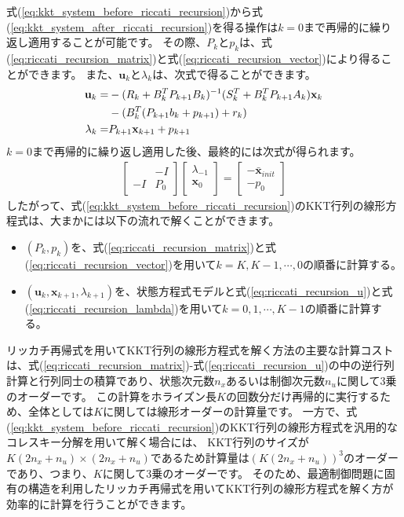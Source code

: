 \documentclass[a4paper]{jarticle}
\begin{document}
式(\ref{eq:kkt_system_before_riccati_recursion})から式(\ref{eq:kkt_system_after_riccati_recursion})を得る操作は$k=0$まで再帰的に繰り返し適用することが可能です。
その際、$P_k$と$p_k$は、式(\ref{eq:riccati_recursion_matrix})と式(\ref{eq:riccati_recursion_vector})により得ることができます。
また、$\mathbf{u}_{k}$と$\lambda_{k}$は、次式で得ることができます。
\begin{align}
\mathbf{u}_{k}
=&
-(R_{k} + B_{k}^TP_{k+1}B_{k} )^{-1}(S_{k}^T + B_k^TP_{k+1}A_{k})\mathbf{x}_{k}
\notag
\\
&
-(B^T_{k}(P_{k+1}b_{k}+p_{k+1}) + r_{k})
\label{eq:riccati_recursion_u}
\\
\lambda_{k}
=&
P_{k+1}\mathbf{x}_{k+1} + p_{k+1}
\label{eq:riccati_recursion_lambda}
\end{align}
$k=0$まで再帰的に繰り返し適用した後、最終的には次式が得られます。
\begin{align*}
\begin{bmatrix}
&  -I\\
-I &  P_{0}
\end{bmatrix}
\begin{bmatrix}
\lambda_{-1}\\
\mathbf{x}_{0}\\
\end{bmatrix}
=
\begin{bmatrix}
-\bar{\mathbf{x}}_{init}\\
-p_{0}
\end{bmatrix}
\end{align*}
したがって、式(\ref{eq:kkt_system_before_riccati_recursion})のKKT行列の線形方程式は、大まかには以下の流れで解くことができます。
\begin{itemize}
\item $(P_k,p_k)$を、式(\ref{eq:riccati_recursion_matrix})と式(\ref{eq:riccati_recursion_vector})を用いて$k=K,K-1,\cdots,0$の順番に計算する。
\item $(\mathbf{u}_{k},\mathbf{x}_{k+1},\lambda_{k+1})$を、状態方程式モデルと式(\ref{eq:riccati_recursion_u})と式(\ref{eq:riccati_recursion_lambda})を用いて$k=0,1,\cdots,K-1$の順番に計算する。
\end{itemize}

リッカチ再帰式を用いてKKT行列の線形方程式を解く方法の主要な計算コストは、式(\ref{eq:riccati_recursion_matrix})-式(\ref{eq:riccati_recursion_u})の中の逆行列計算と行列同士の積算であり、状態次元数$n_x$あるいは制御次元数$n_u$に関して3乗のオーダーです。
この計算をホライズン長$K$の回数分だけ再帰的に実行するため、全体としては$K$に関しては線形オーダーの計算量です。
一方で、式(\ref{eq:kkt_system_before_riccati_recursion})のKKT行列の線形方程式を汎用的なコレスキー分解を用いて解く場合には、
KKT行列のサイズが$K(2n_x+n_u)\times(2n_x+n_u)$であるため計算量は$(K(2n_x+n_u))^3$のオーダーであり、つまり、$K$に関して3乗のオーダーです。
そのため、最適制御問題に固有の構造を利用したリッカチ再帰式を用いてKKT行列の線形方程式を解く方が効率的に計算を行うことができます。
\end{document}
